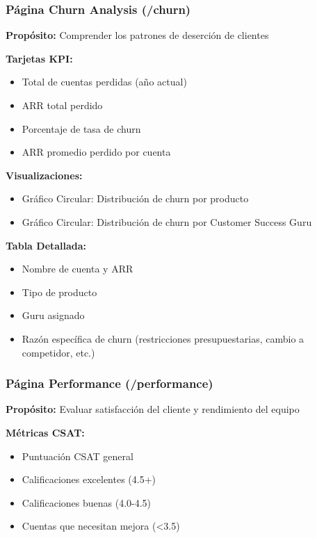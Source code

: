 \documentclass[12pt,a4paper]{article}
\begin{document}
\subsubsection{Página Churn Analysis (/churn)}

\textbf{Propósito:} Comprender los patrones de deserción de clientes

\textbf{Tarjetas KPI:}
\begin{itemize}
    \item Total de cuentas perdidas (año actual)
    \item ARR total perdido
    \item Porcentaje de tasa de churn
    \item ARR promedio perdido por cuenta
\end{itemize}

\textbf{Visualizaciones:}
\begin{itemize}
    \item Gráfico Circular: Distribución de churn por producto
    \item Gráfico Circular: Distribución de churn por Customer Success Guru
\end{itemize}

\textbf{Tabla Detallada:}
\begin{itemize}
    \item Nombre de cuenta y ARR
    \item Tipo de producto
    \item Guru asignado
    \item Razón específica de churn (restricciones presupuestarias, cambio a competidor, etc.)
\end{itemize}

\subsubsection{Página Performance (/performance)}

\textbf{Propósito:} Evaluar satisfacción del cliente y rendimiento del equipo

\textbf{Métricas CSAT:}
\begin{itemize}
    \item Puntuación CSAT general
    \item Calificaciones excelentes (4.5+)
    \item Calificaciones buenas (4.0-4.5)
    \item Cuentas que necesitan mejora (<3.5)
\end{itemize}
\end{document}
